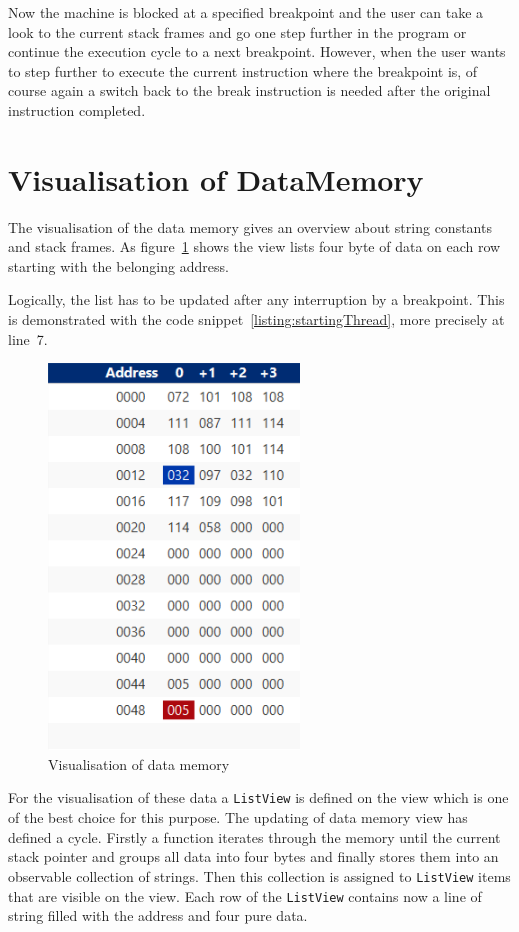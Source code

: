 Now the machine is blocked at a specified breakpoint and the user can take a look to the current stack frames and go one step further in the program or continue the execution cycle to a next breakpoint. However, when the user wants to step further to execute the current instruction where the breakpoint is, of course again a switch back to the break instruction is needed after the original instruction completed.  
\section{Visualisation of DataMemory}
\label{sec:implementationOfDataVisualisation}
The visualisation of the data memory gives an overview about string constants and stack frames. As figure~\ref{fig:dataMemoryView} shows the view lists four byte of data on each row starting with the belonging address. 

Logically, the list has to be updated after any interruption by a breakpoint. This is demonstrated with the code snippet~\ref{listing:startingThread}, more precisely at line~7.

\begin{figure}[h] 
	\centering
	\includegraphics[scale=.99]{images/dataMemory.png}
	\caption{Visualisation of data memory}
	\label{fig:dataMemoryView}
\end{figure}

For the visualisation of these data a \lstinline$ListView$ is defined on the view which is one of the best choice for this purpose. 
The updating of data memory view has defined a cycle. Firstly a function iterates through the memory until the current stack pointer and groups all data into four bytes and finally stores them into an observable collection of strings. Then this collection is assigned to \lstinline$ListView$ items that are visible on the view. Each row of the \lstinline$ListView$ contains now a line of string filled with the address and four pure data. 

